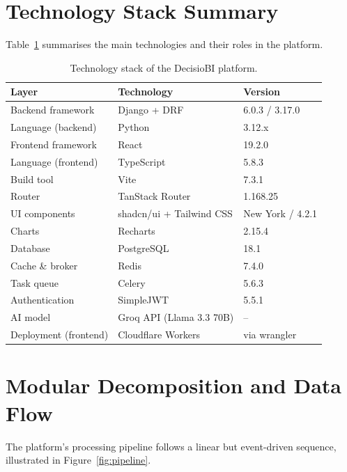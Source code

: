 \section{Technology Stack Summary}

\noindent
Table~\ref{tab:stack} summarises the main technologies
and their roles in the platform.

\begin{table}[h!]
\centering
\caption{Technology stack of the DecisioBI platform.}
\label{tab:stack}
\begin{tabular}{|l|l|l|}
\hline
\textbf{Layer} & \textbf{Technology} & \textbf{Version} \\
\hline
Backend framework & Django + DRF & 6.0.3 / 3.17.0 \\
Language (backend) & Python & 3.12.x \\
Frontend framework & React & 19.2.0 \\
Language (frontend) & TypeScript & 5.8.3 \\
Build tool & Vite & 7.3.1 \\
Router & TanStack Router & 1.168.25 \\
UI components & shadcn/ui + Tailwind CSS & New York / 4.2.1 \\
Charts & Recharts & 2.15.4 \\
Database & PostgreSQL & 18.1 \\
Cache \& broker & Redis & 7.4.0 \\
Task queue & Celery & 5.6.3 \\
Authentication & SimpleJWT & 5.5.1 \\
AI model & Groq API (Llama 3.3 70B) & -- \\
Deployment (frontend) & Cloudflare Workers & via wrangler \\
\hline
\end{tabular}
\end{table}


\section{Modular Decomposition and Data Flow}

\noindent
The platform's processing pipeline follows a linear
but event-driven sequence, illustrated
in Figure~\ref{fig:pipeline}.

